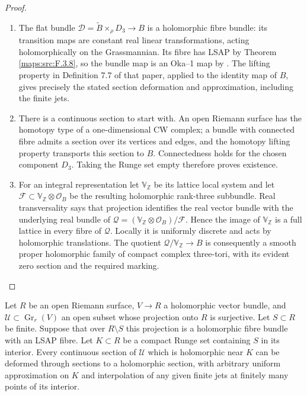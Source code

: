 \begin{proof}
\begin{enumerate}[label={$\langle1\rangle$\arabic*.}]
\item The flat bundle
$\mathscr D=\widetilde B\times_\rho D_3\to B$ is a holomorphic
fibre bundle: its transition maps are constant real linear
transformations, acting holomorphically on the Grassmannian.
Its fibre has LSAP by Theorem \ref{maps:src:F.3.8}, so the bundle map is an
Oka--1 map by \cite[Proposition 7.13(d), p.~24]{IVVOkaOneV5}.
The lifting property in Definition 7.7 of that paper, applied
to the identity map of $B$, gives precisely the stated section
deformation and approximation, including the finite jets.


\item There is a continuous section to start with.  An open Riemann
surface has the homotopy type of a one-dimensional CW complex;
a bundle with connected fibre admits a section over its vertices
and edges, and the homotopy lifting property transports this
section to $B$.  Connectedness holds for the chosen component
$D_3$.  Taking the Runge set empty therefore proves existence.

\item For an integral representation let $\mathbb V_\mathbb Z$ be its
lattice local system and let $\mathcal F\subset
\mathbb V_\mathbb Z\otimes\mathcal O_B$ be the resulting
holomorphic rank-three subbundle.  Real transversality says that
projection identifies the real vector bundle with the underlying
real bundle of
$\mathcal Q=(\mathbb V_\mathbb Z\otimes\mathcal O_B)/\mathcal F$.
Hence the image of $\mathbb V_\mathbb Z$ is a full lattice in
every fibre of $\mathcal Q$.  Locally it is uniformly discrete
and acts by holomorphic translations.  The quotient
$\mathcal Q/\mathbb V_\mathbb Z\to B$ is consequently a smooth
proper holomorphic family of compact complex three-tori,
with its evident zero section and the required marking.

\end{enumerate}
\end{proof}




\begin{lemma}\hypertarget{tag-02O2}{}\label{maps:src:F.3.10}


Let $R$ be an open Riemann surface, $V\to R$ a holomorphic vector
bundle, and $\mathscr U\subset\operatorname{Gr}_r(V)$ an open
subset whose projection onto $R$ is surjective.  Let $S\subset R$
be finite.  Suppose that over $R\setminus S$ this projection is
a holomorphic fibre bundle with an LSAP fibre.  Let $K\subset R$
be a compact Runge set containing $S$ in its interior.
Every continuous section of $\mathscr U$ which is holomorphic
near $K$ can be deformed through sections to a holomorphic
section, with arbitrary uniform approximation on $K$ and
interpolation of any given finite jets at finitely many points
of its interior.

\end{lemma}


